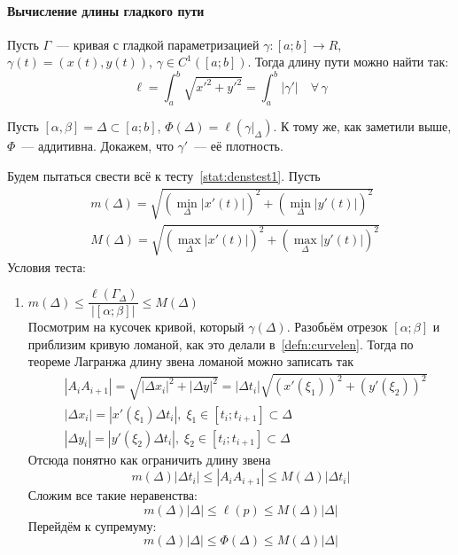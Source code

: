 \documentclass[12pt]{../../notes}
\begin{document}
\paragraph{Вычисление длины гладкого пути}
\begin{thrm}
  Пусть $\Gamma$~--- кривая с гладкой параметризацией $\gamma \colon [a;b]\to R$, $\gamma(t) = (x(t),y(t))$,
  $\gamma \in C^1([a;b])$.
  Тогда длину пути можно найти так: 
  \[
    \ell = \int_a^b \sqrt{x'^2+y'^2} = \int_a^b |\gamma'| \quad \forall\,\gamma
  \]
\end{thrm}
\begin{ittproof}
  Пусть $[\alpha, \beta]=\Delta \subset [a;b]$, $\Phi(\Delta) = \ell(\gamma\big|_\Delta)$. К тому же, как заметили
  выше, $\Phi$~--- аддитивна. Докажем, что $\gamma'$~--- её плотность.

  Будем пытаться свести всё к тесту~\ref{stat:denstest1}. Пусть 
  \begin{align*}
    & m(\Delta) = \sqrt{\left( \min_\Delta |x'(t)| \right)^2 + \left( \min_\Delta |y'(t)| \right)^2}\\
    & M(\Delta) = \sqrt{\left( \max_\Delta |x'(t)| \right)^2 + \left( \max_\Delta |y'(t)| \right)^2}
  \end{align*}
  Условия теста:
  \begin{enumerate}
    \item $m(\Delta) \leqslant \dfrac{\ell(\Gamma_\Delta)}{|[\alpha;\beta]|} \leqslant M(\Delta)$ \\
      Посмотрим на кусочек кривой, который $\gamma(\Delta)$. Разобьём отрезок $[\alpha;\beta]$ 
      и приблизим кривую ломаной, как это делали в~\ref{defn:curvelen}. Тогда по теореме Лагранжа 
      длину звена ломаной можно записать так
      \begin{align*}
        & |A_i A_{i+1}| = \sqrt{|\Delta x_i|^2 + |\Delta y|^2}  = |\Delta t_i|\sqrt{(x'(\xi_1))^2 + (y'(\xi_2))^2}\\
        & |\Delta x_i| = |x'(\xi_1) \Delta t_i|, \; \xi_1 \in [t_i; t_{i+1}] \subset \Delta\\
        & |\Delta y_i| = |y'(\xi_2) \Delta t_i|, \; \xi_2 \in [t_i; t_{i+1}] \subset \Delta
      \end{align*}
      Отсюда понятно как ограничить длину звена 
      \[
        m(\Delta)|\Delta t_i| \leqslant |A_i A_{i+1}| \leqslant M(\Delta) |\Delta t_i|
      \]
      Сложим все такие неравенства:
      \[
        m(\Delta)|\Delta| \leqslant \ell(p) \leqslant M(\Delta) |\Delta|
      \]
      Перейдём к супремуму:
      \[
        m(\Delta) |\Delta| \leqslant \Phi(\Delta) \leqslant M(\Delta) |\Delta|
\]
\end{enumerate}
\end{ittproof}
\end{document}
